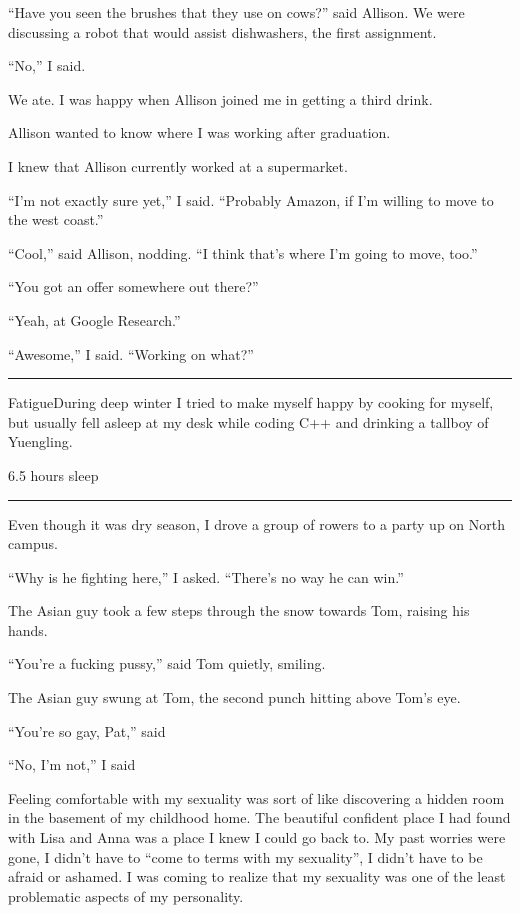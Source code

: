 ``Have you seen the brushes that they use on cows?'' said Allison.  We were
discussing a robot that would assist dishwashers, the first assignment.

``No,'' I said.

We ate.  I was happy when Allison joined me in getting a third drink.

Allison wanted to know where I was working after graduation.

I knew that Allison currently worked at a supermarket. 

``I'm not exactly sure yet,'' I said.  ``Probably Amazon, if I'm willing to move
to the west coast.''

``Cool,'' said Allison, nodding.  ``I think that's where I'm going to move,
too.''

``You got an offer somewhere out there?''

``Yeah, at Google Research.''

``Awesome,'' I said.  ``Working on what?''

\plainfancybreak{12pt}{2}{* * *}

FatigueDuring deep winter I tried to make myself
happy by cooking for myself, but usually fell asleep at my desk while coding C++
and drinking a tallboy of Yuengling.

6.5 hours sleep


\plainfancybreak{12pt}{2}{* * *}

Even though it was dry season, I drove a group of rowers to a party up on North
campus.  

``Why is he fighting here,'' I asked.  ``There's no way he can win.'' 

The Asian guy took a few steps through the snow towards Tom, raising his hands.

``You're a fucking pussy,'' said Tom quietly, smiling. 

The Asian guy swung at Tom, the second punch hitting above Tom's eye.

``You're so gay, Pat,'' said 

``No, I'm not,'' I said

Feeling comfortable with my sexuality was sort of like discovering a hidden room
in the basement of my childhood home.  The beautiful confident place I had found
with Lisa and Anna was a place I knew I could go back to.  My past worries were
gone, I didn't have to ``come to terms with my sexuality'', I didn't have to be
afraid or ashamed.  I was coming to realize that my sexuality was one of the
least problematic aspects of my personality.
 
